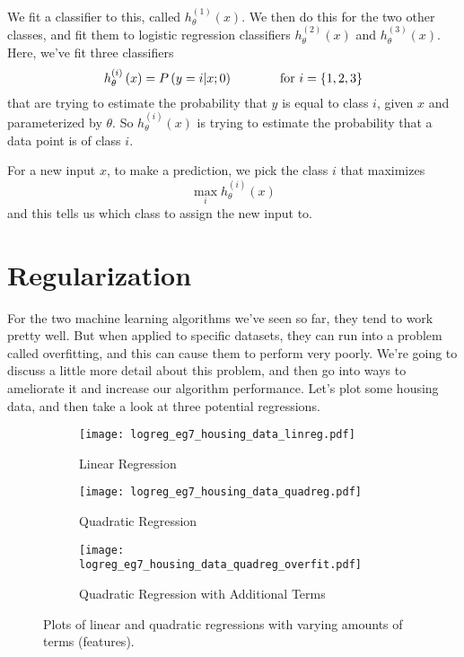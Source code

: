 We fit a classifier to this, called $h_\theta^{\left(1\right)}\left(x\right)$. We then do this for the two other classes, and fit them to logistic regression classifiers $h_\theta^{\left(2\right)}\left(x\right)$ and $h_\theta^{\left(3\right)}\left(x\right)$. Here, we've fit three classifiers
\begin{equation}
h_\theta^{\left(i\right)}\left(x\right) = P\left(y=i | x; 0\right)	~~\mbox{\;\;\;\;\;\;\;\;\;\; for } i = \{1, 2, 3\}
\end{equation}
that are trying to estimate the probability that $y$ is equal to class $i$, given $x$ and parameterized by $\theta$. So  $h_\theta^{\left(i\right)}\left(x\right)$ is trying to estimate the probability that a data point is of class $i$. 

For a new input $x$, to make a prediction, we pick the class $i$ that maximizes 
\begin{equation}
\max_i  h_\theta^{\left(i\right)}\left(x\right)
\end{equation}
and this tells us which class to assign the new input to. 





\section{Regularization}
For the two machine learning algorithms we've seen so far, they tend to work pretty well. But when applied to specific datasets, they can run into a problem called overfitting, and this can cause them to perform very poorly. We're going to discuss a little more detail about this problem, and then go into ways to ameliorate it and increase our algorithm performance. Let's plot some housing data, and then take a look at three potential regressions. 

\begin{figure}[h]
	\centering
	\begin{subfigure}[t]{0.3\textwidth}
   		\centering
    		\graphicspath{{./Figures/}}
  		\texttt{[image: logreg\_eg7\_housing\_data\_linreg.pdf]} 
   		\caption[]{Linear Regression}
   		\label{logreg_eg7_housing_data_linreg.pdf}
	\end{subfigure}
	\begin{subfigure}[t]{0.3\textwidth}
   		\centering
    		\graphicspath{{./Figures/}}
   		\texttt{[image: logreg\_eg7\_housing\_data\_quadreg.pdf]} 
   		\caption[]{Quadratic Regression}
   		\label{logreg_eg7_housing_data_quadreg.pdf}
	\end{subfigure}
	\begin{subfigure}[t]{0.3\textwidth}
   		\centering
    		\graphicspath{{./Figures/}}
   		\texttt{[image: logreg\_eg7\_housing\_data\_quadreg\_overfit.pdf]} 
   		\caption[]{Quadratic Regression with Additional Terms}
   		\label{logreg_eg7_housing_data_quadreg_overfit.pdf}
	\end{subfigure}
	\caption[]{Plots of linear and quadratic regressions with varying amounts of terms (features). }
\end{figure}

